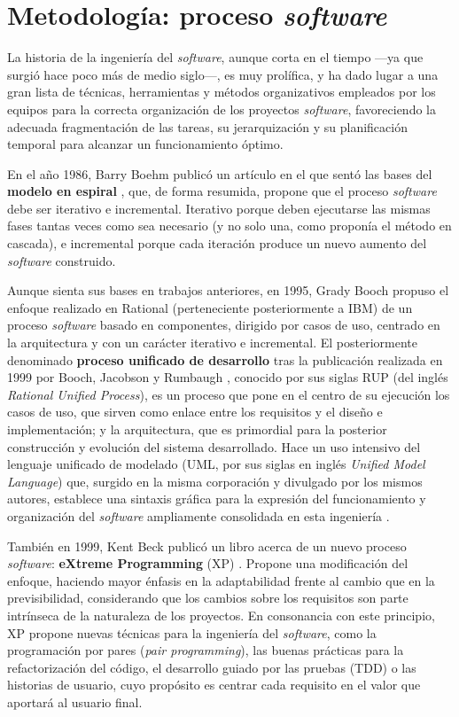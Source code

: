 \section{Metodología: proceso \textit{software}}
\label{sec:metodologia}

La historia de la ingeniería del \textit{software}, aunque corta en el tiempo ---ya que surgió hace poco más de medio siglo---, es muy prolífica, y ha dado lugar a una gran lista de técnicas, herramientas y métodos organizativos empleados por los equipos para la correcta organización de los proyectos \textit{software}, favoreciendo la adecuada fragmentación de las tareas, su jerarquización y su planificación temporal para alcanzar un funcionamiento óptimo.

En el año 1986, Barry Boehm publicó un artículo en el que sentó las bases del \textbf{modelo en espiral} \cite{ModeloEspiral}, que, de forma resumida, propone que el proceso \textit{software} debe ser iterativo e incremental. Iterativo porque deben ejecutarse las mismas fases tantas veces como sea necesario (y no solo una, como proponía el método en cascada), e incremental porque cada iteración produce un nuevo aumento del \textit{software} construido.

Aunque sienta sus bases en trabajos anteriores, en 1995, Grady Booch propuso el enfoque realizado en Rational (perteneciente posteriormente a IBM) de un proceso \textit{software} basado en componentes, dirigido por casos de uso, centrado en la arquitectura y con un carácter iterativo e incremental. El posteriormente denominado \textbf{proceso unificado de desarrollo} tras la publicación realizada en 1999 por Booch, Jacobson y Rumbaugh \cite{RUP}, conocido por sus siglas RUP (del inglés \textit{Rational Unified Process}), es un proceso que pone en el centro de su ejecución los casos de uso, que sirven como enlace entre los requisitos y el diseño e implementación; y la arquitectura, que es primordial para la posterior construcción y evolución del sistema desarrollado. Hace un uso intensivo del lenguaje unificado de modelado (UML, por sus siglas en inglés \textit{Unified Model Language}) que, surgido en la misma corporación y divulgado por los mismos autores, establece una sintaxis gráfica para la expresión del funcionamiento y organización del \textit{software} ampliamente consolidada en esta ingeniería \cite{UML}.

También en 1999, Kent Beck publicó un libro acerca de un nuevo proceso \textit{software}: \textbf{eXtreme Programming} (XP) \cite{XP}. Propone una modificación del enfoque, haciendo mayor énfasis en la adaptabilidad frente al cambio que en la previsibilidad, considerando que los cambios sobre los requisitos son parte intrínseca de la naturaleza de los proyectos. En consonancia con este principio, XP propone nuevas técnicas para la ingeniería del \textit{software}, como la programación por pares (\textit{pair programming}), las buenas prácticas para la refactorización del código, el desarrollo guiado por las pruebas (TDD) o las historias de usuario, cuyo propósito es centrar cada requisito en el valor que aportará al usuario final.

